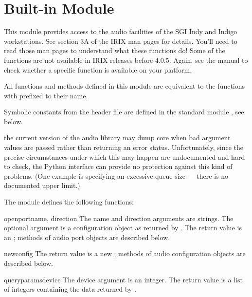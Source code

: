 \section{Built-in Module }
\label{module-al}

This module provides access to the audio facilities of the SGI Indy
and Indigo workstations.  See section 3A of the IRIX man pages for
details.  You'll need to read those man pages to understand what these
functions do!  Some of the functions are not available in IRIX
releases before 4.0.5.  Again, see the manual to check whether a
specific function is available on your platform.

All functions and methods defined in this module are equivalent to
the \C{} functions with  prefixed to their name.

Symbolic constants from the \C{} header file  are
defined in the standard module , see
below.

 the current version of the audio library may dump core
when bad argument values are passed rather than returning an error
status.  Unfortunately, since the precise circumstances under which
this may happen are undocumented and hard to check, the Python
interface can provide no protection against this kind of problems.
(One example is specifying an excessive queue size --- there is no
documented upper limit.)

The module defines the following functions:


\begin{funcdesc}{openport}{name, direction}
The name and direction arguments are strings.  The optional
 argument is a configuration object as returned by
.  The return value is an ; methods of audio port objects are described below.
\end{funcdesc}

\begin{funcdesc}{newconfig}{}
The return value is a new ; methods of
audio configuration objects are described below.
\end{funcdesc}

\begin{funcdesc}{queryparams}{device}
The device argument is an integer.  The return value is a list of
integers containing the data returned by .
\end{funcdesc}

